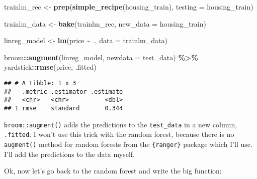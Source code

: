 \documentclass[
]{article}
\newenvironment{Shaded}{\begin{snugshade}}{\end{snugshade}}
\newcommand{\DataTypeTok}[1]{\textcolor[rgb]{0.13,0.29,0.53}{#1}}
\newcommand{\KeywordTok}[1]{\textcolor[rgb]{0.13,0.29,0.53}{\textbf{#1}}}
\newcommand{\NormalTok}[1]{#1}
\newcommand{\OperatorTok}[1]{\textcolor[rgb]{0.81,0.36,0.00}{\textbf{#1}}}
\newcommand{\StringTok}[1]{\textcolor[rgb]{0.31,0.60,0.02}{#1}}
\begin{document}
\begin{Shaded}
\begin{Highlighting}[]
\NormalTok{trainlm\_rec \textless{}{-}}\StringTok{ }\KeywordTok{prep}\NormalTok{(}\KeywordTok{simple\_recipe}\NormalTok{(housing\_train), }\DataTypeTok{testing =}\NormalTok{ housing\_train)}

\NormalTok{trainlm\_data \textless{}{-}}\StringTok{ }\KeywordTok{bake}\NormalTok{(trainlm\_rec, }\DataTypeTok{new\_data =}\NormalTok{ housing\_train)}

\NormalTok{linreg\_model \textless{}{-}}\StringTok{ }\KeywordTok{lm}\NormalTok{(price }\OperatorTok{\textasciitilde{}}\StringTok{ }\NormalTok{., }\DataTypeTok{data =}\NormalTok{ trainlm\_data)}

\NormalTok{broom}\OperatorTok{::}\KeywordTok{augment}\NormalTok{(linreg\_model, }\DataTypeTok{newdata =}\NormalTok{ test\_data) }\OperatorTok{\%\textgreater{}\%}\StringTok{ }
\StringTok{    }\NormalTok{yardstick}\OperatorTok{::}\KeywordTok{rmse}\NormalTok{(price, .fitted)}
\end{Highlighting}
\end{Shaded}

\begin{verbatim}
## # A tibble: 1 x 3
##   .metric .estimator .estimate
##   <chr>   <chr>          <dbl>
## 1 rmse    standard       0.344
\end{verbatim}

\texttt{broom::augment()} adds the predictions to the \texttt{test\_data} in a new column, \texttt{.fitted}. I won't
use this trick with the random forest, because there is no \texttt{augment()} method for random forests
from the \texttt{\{ranger\}} package which I'll use. I'll add the predictions to the data myself.

Ok, now let's go back to the random forest and write the big function:
\end{document}
